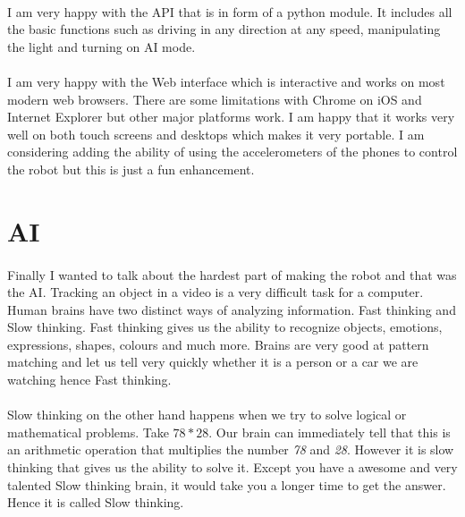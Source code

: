\documentclass[12pt,a4paper]{report}
\begin{document}
\paragraph{}
I am very happy with the API that is in form of a python module. It includes all the basic functions such as driving in any direction at any speed, manipulating the light and turning on AI mode.

\paragraph{}
I am very happy with the Web interface which is interactive and works on most modern web browsers. There are some limitations with Chrome on iOS and Internet Explorer but other major platforms work. I am happy that it works very well on both touch screens and desktops which makes it very portable. I am considering adding the ability of using the accelerometers of the phones to control the robot but this is just a fun enhancement.

\section{AI}

\paragraph{}
Finally I wanted to talk about the hardest part of making the robot and that was the AI. Tracking an object in a video is a very difficult task for a computer. Human brains have two distinct ways of analyzing information. Fast thinking and Slow thinking. Fast thinking gives us the ability to recognize objects, emotions, expressions, shapes, colours and much more. Brains are very good at pattern matching and let us tell very quickly whether it is a person or a car we are watching hence Fast thinking.

\paragraph{}
Slow thinking on the other hand happens when we try to solve logical or mathematical problems. Take $78*28$. Our brain can immediately tell that this is an arithmetic operation that multiplies the number \textit{78}  and \textit{28}. However it is slow thinking that gives us the ability to solve it. Except you have a awesome and very talented Slow thinking brain, it would take you a longer time to get the answer. Hence it is called Slow thinking.
\end{document}
